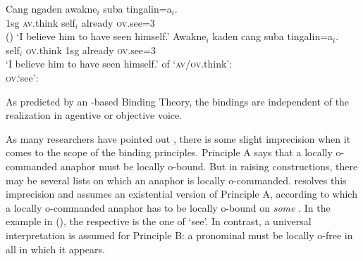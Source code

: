 \documentclass[output=paper,biblatex,babelshorthands,newtxmath,draftmode,colorlinks,citecolor=brown]{langscibook}
\begin{document}
\eal
\ex 
\gll Cang ngaden awakne$_i$ suba tingalin=a$_i$.\\
    1sg \textsc{av}.think self$_i$ already \textsc{ov}.see=3\\\hfill()
\glt `I believe him to have seen himself.'
\ex
\gll Awakne$_i$ kaden cang suba tingalin=a$_i$.\\
     self$_i$   \textsc{ov}.think 1sg already \textsc{ov}.see=3\\
\glt `I believe him to have seen himself.'
\ex \argst of `\textsc{av}/\textsc{ov}.think':\\
\ex \textsc{ov}.`see':\\
\zl

\noindent
As predicted by an \argst-based Binding Theory, the bindings are independent of the realization in
agentive or objective voice.

As many researchers have pointed out \parencites[Section~5]{NB96a}[Section~20.4.2]{Mueller99a}, there is some slight imprecision when it comes to the scope of the
binding principles. Principle A says that a locally o-commanded anaphor must be locally o-bound. But in raising
constructions, there may be several lists on which an anaphor is locally
o-commanded. \citet{Wechsler99a} resolves this imprecision and assumes an existential version of
Principle A, according to which a locally o-commanded anaphor has to be locally o-bound on
\emph{some} \argst. In the example in (), the respective \argstl is the one of `see'. In
contrast, a universal interpretation is assumed for Principle B: a pronominal must be locally o-free
in all \argstls in which it appears.
\end{document}
